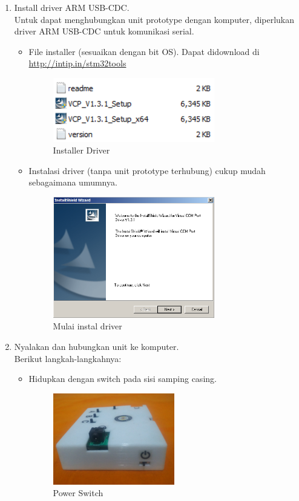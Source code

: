 \documentclass[12pt,]{article}
\begin{document}
	\begin{enumerate}
		\item Install driver ARM USB-CDC.\\
		Untuk dapat menghubungkan unit prototype dengan komputer,
		diperlukan driver ARM USB-CDC untuk komunikasi serial.
		
		\begin{itemize}
			\item File installer (sesuaikan dengan bit OS).
			Dapat didownload di \url{http://intip.in/stm32tools}
			\begin{figure}[!ht]
				\centering
				\includegraphics[width=200pt]{images/terminal/driver}
				\caption{Installer Driver}
			\end{figure}
			
			\item Instalasi driver (tanpa unit prototype terhubung) cukup mudah sebagaimana umumnya.
			\begin{figure}[!ht]
				\centering
				\includegraphics[width=200pt]{images/terminal/install_driver}
				\caption{Mulai instal driver}
			\end{figure}
		\end{itemize}
		
		\newpage
		\item Nyalakan dan hubungkan unit ke komputer.\\
		
		Berikut langkah-langkahnya:
		\begin{itemize}
			\item Hidupkan dengan switch pada sisi samping casing.
			\begin{figure}[!ht]
				\centering
				\includegraphics[width=150pt]{images/foto/pwrsw}
				\caption{Power Switch}
			\end{figure}
			

\end{itemize}
\end{enumerate}
\end{document}
